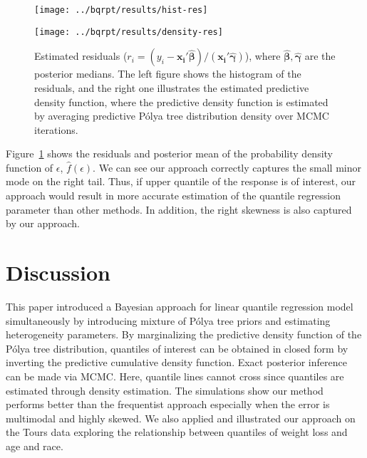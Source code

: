 \documentclass[12pt]{article}
\newcommand{\polya}{P\'{o}lya}
\begin{document}
\begin{figure}[htbp]
  \begin{minipage}{0.5\linewidth}
    \centerline{\texttt{[image: ../bqrpt/results/hist-res]}}
  \end{minipage}
  \begin{minipage}{0.5\linewidth}
    \centerline{\texttt{[image: ../bqrpt/results/density-res]}}
  \end{minipage}
  \caption[]{\label{fig:tourpost} Estimated residuals ($r_i = (y_i-
    \bm{x_i'\hat{\beta}})/(\bm{x_i'\hat{\gamma}})$), where
    $\hat{\bm{\beta}}, \hat{\bm{\gamma}}$ are the posterior medians. The left
    figure shows the histogram of the residuals, and the right one
    illustrates the estimated predictive density function, where the
    predictive density function is estimated by averaging predictive
    \polya{} tree distribution density over MCMC iterations.}
\end{figure}

Figure~\ref{fig:tourpost} shows the residuals and posterior mean of the
probability density function of $\epsilon$, $\hat{f}(\epsilon)$. We
can see our approach correctly captures the small minor mode on
the right tail. Thus, if upper quantile of the response is of interest, our
approach would result in more accurate estimation of the quantile regression
parameter than other methods. In addition, the right skewness is also
captured by our approach.

\section{Discussion}
This paper introduced a Bayesian approach for linear quantile
regression model simultaneously by introducing mixture of \polya{}
tree priors and estimating heterogeneity parameters. By marginalizing
the predictive density function of the \polya{} tree distribution,
quantiles of interest can be obtained in closed form by inverting the
predictive cumulative density function. Exact posterior inference can
be made via MCMC. Here, quantile lines cannot cross since quantiles
are estimated through density estimation.  The simulations show our
method performs better than the frequentist approach especially when
the error is multimodal and highly skewed. We also applied and
illustrated our approach on the Tours data exploring the relationship
between quantiles of weight loss and age and race.
\end{document}
